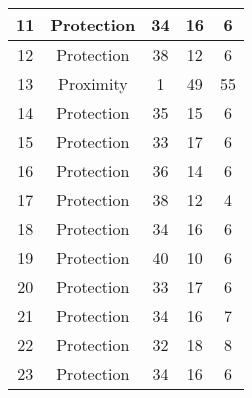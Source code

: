 \documentclass[results.tex]{subfiles}
\begin{document}
\begin{center}
\begin{tabular}{| c || c | c | c | c |}
            \hline
            11                      & Protection                   & 34                     & 16                      & 6                    \\
            \hline
            12                      & Protection                   & 38                     & 12                      & 6                    \\
            \hline
            13                      & Proximity                    & 1                      & 49                      & 55                   \\
            \hline
            14                      & Protection                   & 35                     & 15                      & 6                    \\
            \hline
            15                      & Protection                   & 33                     & 17                      & 6                    \\
            \hline
            16                      & Protection                   & 36                     & 14                      & 6                    \\
            \hline
            17                      & Protection                   & 38                     & 12                      & 4                    \\
            \hline
            18                      & Protection                   & 34                     & 16                      & 6                    \\
            \hline
            19                      & Protection                   & 40                     & 10                      & 6                    \\
            \hline
            20                      & Protection                   & 33                     & 17                      & 6                    \\
            \hline
            21                      & Protection                   & 34                     & 16                      & 7                    \\
            \hline
            22                      & Protection                   & 32                     & 18                      & 8                    \\
            \hline
            23                      & Protection                   & 34                     & 16                      & 6                    \\

\end{tabular}
\end{center}
\end{document}
